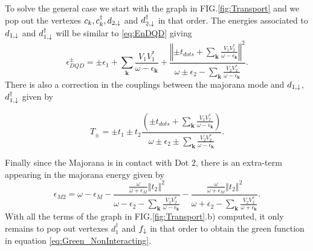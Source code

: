 \documentclass[showpacs,aps,prb,reprint,superscriptaddress]{revtex4-1}
\begin{document}
To solve  the general case we start with the graph in FIG.\ref{fig:Transport} and we pop out the vertexes $c_k,c^\dagger_k, d_{2,\downarrow}$ and $ d^\dagger_{2,\downarrow}$ in that order. The energies associated to $d_{1,\downarrow}$ and $d^\dagger_{1,\downarrow}$ will be similar to \eqref{eq:EnDQD} giving 
\begin{equation}
    \epsilon_{DQD}^{\pm}=\pm\epsilon_{1}+\sum_{\mathbf{k}}\frac{V_{1}V_{1}^{*}}{\omega-\epsilon_{\mathbf{k}}}+\frac{\left\Vert \pm t_{dots}+\sum_{\mathbf{k}}\frac{V_{1}V_{2}^{*}}{\omega-\epsilon_{\mathbf{k}}}\right\Vert ^{2}}{\omega\pm\epsilon_{2}-\sum_{\mathbf{k}}\frac{V_{2}V_{2}^{*}}{\omega-\epsilon_{\mathbf{k}}}}.
\end{equation}
\noindent There is also a correction in the couplings between the majorana mode and $d_{1,\downarrow}$, $d^\dagger_{1,\downarrow}$ given by 

\begin{equation}
    T_{\pm}=\pm t_{1}\pm t_{2}\frac{\left(\pm t_{dots}+\sum_{\mathbf{k}}\frac{V_{1}V_{2}^{*}}{\omega-\epsilon_{\mathbf{k}}}\right)}{\omega\pm\epsilon_{2}\pm\sum_{\mathbf{k}}\frac{V_{2}V_{2}^{*}}{\omega-\epsilon_{\mathbf{k}}}}. 
\end{equation}

Finally since the Majorana is in contact with Dot $2$, there is an extra-term appearing in the  majorana energy given by 
\begin{equation}
    \epsilon_{M2}=\omega-\epsilon_{M}-\frac{\frac{\omega}{\omega+\epsilon_{M}}\left\Vert t_{2}\right\Vert ^{2} } {\omega-\epsilon_{2}-\sum_{\mathbf{k}}\frac{V_{2}V_{2}^{*}}{\omega-\epsilon_{\mathbf{k}}}}-\frac{\frac{\omega}{\omega+\epsilon_{M}}\left\Vert t_{2}\right\Vert ^{2}}{\omega+\epsilon_{2}-\sum_{\mathbf{k}}\frac{V_{2}V_{2}^{*}}{\omega+\epsilon_{\mathbf{k}}}}.
\end{equation}
With all the terms of the graph in FIG.\ref{fig:Transport}.b) computed, it only remains to pop out vertexes $d^\dagger_1$ and $f_\downarrow$ in that order to obtain the green function in equation \eqref{eq:Green_NonInteracting}. 













 



\end{document}
